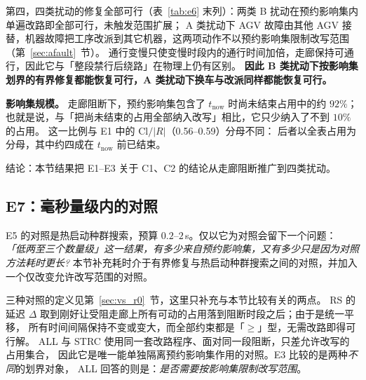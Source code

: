 \documentclass[manuscript,screen,review]{acmart}
\providecommand{\STRC}{\textsc{STRC}}
\newcommand{\EoneCloLo}{0.56}
\newcommand{\EoneCloHi}{0.59}
\newcommand{\ClosureAliveFrac}{92\%}
\begin{document}
第四，四类扰动的修复全部可行（表~\ref{tab:e6} 末列）：两类 B 扰动在预约影响集内单遍改路即全部可行，未触发范围扩展；
A 类扰动下 AGV 故障由其他 AGV 接替，机器故障把工序改派到其它机器，这两项动作不以预约影响集限制改写范围（第~\ref{sec:afault}~节）。
通行变慢只使变慢时段内的通行时间加倍，走廊保持可通行，因此它与「整段禁行后绕路」在物理上仍有区别。
\textbf{因此 B 类扰动下按影响集划界的有界修复都能恢复可行，A 类扰动下换车与改派同样都能恢复可行。}

\textbf{影响集规模。} 走廊阻断下，预约影响集包含了 \(t_{\mathrm{now}}\) 时尚未结束占用中的约 \(\ClosureAliveFrac\)；
也就是说，与「把尚未结束的占用全部纳入改写」相比，它只少纳入了不到 \(10\%\) 的占用。
这一比例与 E1 中的 \(\mathrm{Cl}/|R|\)（\EoneCloLo--\EoneCloHi）分母不同：
后者以全表占用为分母，其中约四成在 \(t_{\mathrm{now}}\) 前已结束。

结论：本节结果把 E1--E3 关于 C1、C2 的结论从走廊阻断推广到四类扰动。

\subsection{E7：毫秒量级内的对照}
\label{sec:cheap}

E5 的对照是热启动种群搜索，预算 \(0.2\)--\(2\)\,s。仅以它为对照会留下一个问题：
\emph{「低两至三个数量级」这一结果，有多少来自预约影响集，又有多少只是因为对照方法耗时更长?}
本节补充耗时介于有界修复与热启动种群搜索之间的对照，并加入一个仅改变允许改写范围的对照。

三种对照的定义见第~\ref{sec:vs_r0}~节，这里只补充与本节比较有关的两点。
RS 的延迟 \(\Delta\) 取到刚好让受阻走廊上所有可动的占用落到阻断时段之后；由于是统一平移，
所有时间间隔保持不变或变大，而全部约束都是「\(\ge\)」型，无需改路即得可行解。
ALL 与 \STRC{} 使用同一套改路程序、面对同一段阻断，只差允许改写的占用集合，
因此它是唯一能单独隔离预约影响集作用的对照。E3 比较的是两种\emph{不同}的划界对象，
ALL 回答的则是：\emph{是否需要按影响集限制改写范围}。
\end{document}
